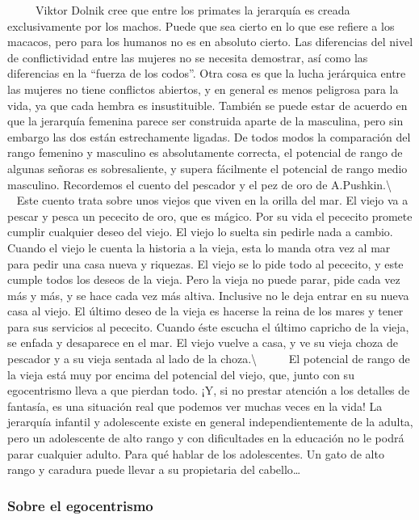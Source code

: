 ~ ~ ~ Viktor Dolnik cree que entre los primates la jerarquía es creada
exclusivamente por los machos. Puede que sea cierto en lo que ese
refiere a los macacos, pero para los humanos no es en absoluto cierto.
Las diferencias del nivel de conflictividad entre las mujeres no se
necesita demostrar, así como las diferencias en la ``fuerza de los
codos''. Otra cosa es que la lucha jerárquica entre las mujeres no tiene
conflictos abiertos, y en general es menos peligrosa para la vida, ya
que cada hembra es insustituible. También se puede estar de acuerdo en
que la jerarquía femenina parece ser construida aparte de la masculina,
pero sin embargo las dos están estrechamente ligadas. De todos modos la
comparación del rango femenino y masculino es absolutamente correcta, el
potencial de rango de algunas señoras es sobresaliente, y supera
fácilmente el potencial de rango medio masculino. Recordemos el cuento
del pescador y el pez de oro de A.Pushkin.\textbackslash{} ~ ~ ~ Este
cuento trata sobre unos viejos que viven en la orilla del mar. El viejo
va a pescar y pesca un pececito de oro, que es mágico. Por su vida el
pececito promete cumplir cualquier deseo del viejo. El viejo lo suelta
sin pedirle nada a cambio. Cuando el viejo le cuenta la historia a la
vieja, esta lo manda otra vez al mar para pedir una casa nueva y
riquezas. El viejo se lo pide todo al pececito, y este cumple todos los
deseos de la vieja. Pero la vieja no puede parar, pide cada vez más y
más, y se hace cada vez más altiva. Inclusive no le deja entrar en su
nueva casa al viejo. El último deseo de la vieja es hacerse la reina de
los mares y tener para sus servicios al pececito. Cuando éste escucha el
último capricho de la vieja, se enfada y desaparece en el mar. El viejo
vuelve a casa, y ve su vieja choza de pescador y a su vieja sentada al
lado de la choza.\textbackslash{} ~ ~ ~ El potencial de rango de la
vieja está muy por encima del potencial del viejo, que, junto con su
egocentrismo lleva a que pierdan todo. ¡Y, si no prestar atención a los
detalles de fantasía, es una situación real que podemos ver muchas veces
en la vida! La jerarquía infantil y adolescente existe en general
independientemente de la adulta, pero un adolescente de alto rango y con
dificultades en la educación no le podrá parar cualquier adulto. Para
qué hablar de los adolescentes. Un gato de alto rango y caradura puede
llevar a su propietaria del cabello\ldots{}

\protect\hypertarget{M22}{}{}

\subsubsection{Sobre el egocentrismo}\label{sobre-el-egocentrismo}

